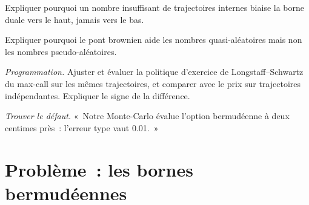 \begin{exercise}[$\star\star$]\label{exo:dv:monte-carlo-pricers-in-practice:5}
Expliquer pourquoi un nombre insuffisant de trajectoires internes biaise la borne duale vers le haut, jamais vers le bas.
\end{exercise}

\begin{exercise}[$\star\star$]\label{exo:dv:monte-carlo-pricers-in-practice:6}
Expliquer pourquoi le pont brownien aide les nombres quasi-aléatoires mais non les nombres pseudo-aléatoires.
\end{exercise}

\begin{exercise}[$\star\star\star$]\label{exo:dv:monte-carlo-pricers-in-practice:7}
\emph{Programmation.} Ajuster et évaluer la politique d'exercice de Longstaff--Schwartz du max-call sur les mêmes trajectoires, et comparer avec le prix sur trajectoires indépendantes. Expliquer le signe de la
différence.
\end{exercise}

\begin{exercise}[$\star\star\star$]\label{exo:dv:monte-carlo-pricers-in-practice:8}
\emph{Trouver le défaut.} «~Notre Monte-Carlo évalue l'option bermudéenne à deux centimes près~: l'erreur type vaut 0.01.~»
\end{exercise}

\section{Problème~: les bornes bermudéennes}

